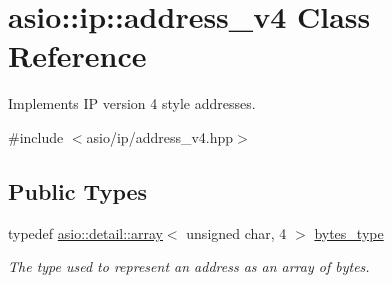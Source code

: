 \hypertarget{classasio_1_1ip_1_1address__v4}{}\section{asio\+:\+:ip\+:\+:address\+\_\+v4 Class Reference}
\label{classasio_1_1ip_1_1address__v4}


Implements I\+P version 4 style addresses.  




{\ttfamily \#include $<$asio/ip/address\+\_\+v4.\+hpp$>$}

\subsection*{Public Types}
\begin{DoxyCompactItemize}
\item 
typedef \hyperlink{classboost_1_1array}{asio\+::detail\+::array}$<$ unsigned char, 4 $>$ \hyperlink{classasio_1_1ip_1_1address__v4_a215b307474a39b561a7dd9be3e7a99ad}{bytes\+\_\+type}
\begin{DoxyCompactList}\small\item\em The type used to represent an address as an array of bytes. \end{DoxyCompactList}\end{DoxyCompactItemize}
